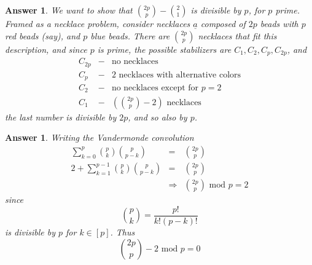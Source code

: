 \documentclass[11pt,english]{article}
\newtheorem{answer}[theorem]{Answer}
\begin{document}
\begin{answer}

We want to show that ${2p \choose p}-{2 \choose 1}$ is divisible
by $p$, for $p$ prime. Framed as a necklace problem, consider necklaces
$\underline{a}$ composed of $2p$ beads with $p$ red beads (say),
and $p$ blue beads. There are ${2p \choose p}$ necklaces that fit
this description, and since $p$ is prime, the possible stabilizers
are $C_{1},C_{2},C_{p},C_{2p}$, and \begin{eqnarray*}
C_{2p} & - & \text{no necklaces}\\
C_{p} & - & 2\text{ necklaces with alternative colors}\\
C_{2} & - & \text{no necklaces except for }p=2\\
C_{1} & - & \left({2p \choose p}-2\right)\text{ necklaces}\end{eqnarray*}
the last number is divisible by $2p$, and so also by $p$.

\end{answer}

\begin{answer}

Writing the Vandermonde convolution\begin{eqnarray*}
\sum_{k=0}^{p}{p \choose k}{p \choose p-k} & = & {2p \choose p}\\
2+\sum_{k=1}^{p-1}{p \choose k}{p \choose p-k} & = & {2p \choose p}\\
 & \Rightarrow & {2p \choose p}\text{ mod }p=2\end{eqnarray*}
since \[
{p \choose k}=\frac{p!}{k!\left(p-k\right)!}\]
is divisible by $p$ for $k\in\left[p\right]$. Thus\[
{2p \choose p}-2\text{ mod }p=0\]
 

\end{answer}
\end{document}
